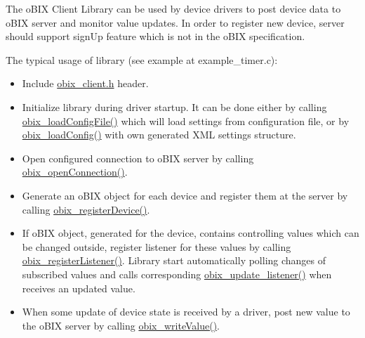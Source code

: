 The oBIX Client Library can be used by device drivers to post device data to oBIX server and monitor value updates. In order to register new device, server should support signUp feature which is not in the oBIX specification. \par
 The typical usage of library (see example at example\_\-timer.c): \begin{itemize}
\item Include \hyperlink{obix__client_8h}{obix\_\-client.h} header.\end{itemize}
\begin{itemize}
\item Initialize library during driver startup. It can be done either by calling \hyperlink{obix__client_8c_227b9d2362a744a4d3af43c31eec92bb}{obix\_\-loadConfigFile()} which will load settings from configuration file, or by \hyperlink{obix__client_8c_bea2db6474251887a883016e86a02198}{obix\_\-loadConfig()} with own generated XML settings structure.\end{itemize}
\begin{itemize}
\item Open configured connection to oBIX server by calling \hyperlink{obix__client_8c_79a8743c9b012df3af7a06483fb7d7cc}{obix\_\-openConnection()}.\end{itemize}
\begin{itemize}
\item Generate an oBIX object for each device and register them at the server by calling \hyperlink{obix__client_8c_dd3c667748a3796f3b3945f96a86095b}{obix\_\-registerDevice()}.\end{itemize}
\begin{itemize}
\item If oBIX object, generated for the device, contains controlling values which can be changed outside, register listener for these values by calling \hyperlink{obix__client_8c_6d554298664e9ad93b62e83d1606d02e}{obix\_\-registerListener()}. Library start automatically polling changes of subscribed values and calls corresponding \hyperlink{obix__client_8h_0197aa45d0471b2708a5bd01c30d7786}{obix\_\-update\_\-listener()} when receives an updated value.\end{itemize}
\begin{itemize}
\item When some update of device state is received by a driver, post new value to the oBIX server by calling \hyperlink{obix__client_8c_345851205b8c47f22eb6c95242842db6}{obix\_\-writeValue()}.\end{itemize}
